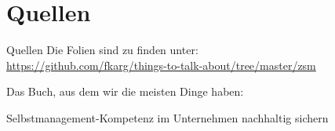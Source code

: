 \section{Quellen}
\begin{frame}{Quellen}
    Die Folien sind zu finden unter: \\
    \url{https://github.com/fkarg/things-to-talk-about/tree/master/zsm}

	\hspace{2cm}

    Das Buch, aus dem wir die meisten Dinge haben:

    \begin{thebibliography}{10}
    \beamertemplatebookbibitems
        Selbstmanagement-Kompetenz im Unternehmen nachhaltig sichern

    \newpage
    

\end{thebibliography}
\end{frame}

